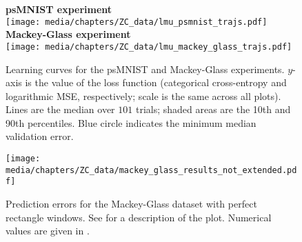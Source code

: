 \begin{figure}
	\sffamily\small
	\centering
	\textbf{psMNIST experiment}\\[0.125cm]
	\texttt{[image: media/chapters/ZC\_data/lmu\_psmnist\_trajs.pdf]}\\[0.25cm]
	\textbf{Mackey-Glass experiment}\\[0.125cm]
	\texttt{[image: media/chapters/ZC\_data/lmu\_mackey\_glass\_trajs.pdf]}
	\caption[Learning curves for the psMNIST and Mackey-Glass experiments]{Learning curves for the psMNIST and Mackey-Glass experiments. $y$-axis is the value of the loss function (categorical cross-entropy and logarithmic MSE, respectively; scale is the same across all plots). Lines are the median over $101$ trials; shaded areas are the 10th and 90th percentiles. Blue circle indicates the minimum median validation error.}
	\label{fig:lmu_trajs}
\end{figure}


\begin{figure}[p]
\centering
\texttt{[image: media/chapters/ZC\_data/mackey\_glass\_results\_not\_extended.pdf]}
\caption[Prediction errors for the Mackey-Glass dataset with perfect rectangle windows]{Prediction errors for the Mackey-Glass dataset with perfect rectangle windows. See  for a description of the plot.
Numerical values are given in .}
\label{fig:mackey_glass_ne}
\end{figure}

